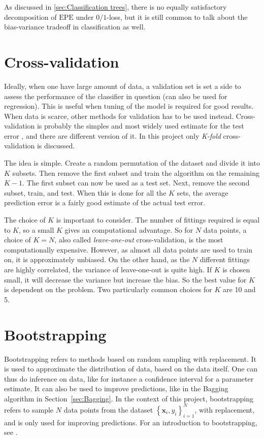 As discussed in \ref{sec:Classification trees}, there is no equally satisfactory decomposition of $\mathrm{EPE}$ under $0/1$-loss, but it is still common to talk about the bias-variance tradeoff in classification as well.



\section{Cross-validation}
\label{sec:Cross-validation}
Ideally, when one have large amount of data, a validation set is set a side to assess the performance of the classifier in question (can also be used for regression). This is useful when tuning of the model is required for good results. When data is scarce, other methods for validation has to be used instead. Cross-validation is probably the simples and most widely used estimate for the test error \citep{modstat}, and there are different version of it. In this project only \textit{K-fold} cross-validation is discussed. 

The idea is simple. Create a random permutation of the dataset and divide it into $K$ subsets. Then remove the first subset and train the algorithm on the remaining $K-1$. The first subset can now be used as a test set. Next, remove the second subset, train, and test. When this is done for all the $K$ sets, the average prediction error is a fairly good estimate of the actual test error. 

The choice of $K$ is important to consider. The number of fittings required is equal to $K$, so a small $K$ gives an computational advantage. So for $N$ data points, a choice of $K = N$, also called \textit{leave-one-out} cross-validation, is the most computationally expensive. However, as almost all data points are used to train on, it is approximately unbiased. On the other hand, as the $N$ different fittings are highly correlated, the variance of leave-one-out is quite high. If $K$ is chosen small, it will decrease the variance but increase the bias. So the best value for $K$ is dependent on the problem. Two particularly common choices for $K$ are 10 and 5.


\section{Bootstrapping}
\label{sec:Bootstrapping}
Bootstrapping refers to methods based on random sampling with replacement. It is used to approximate the distribution of data, based on the data itself. One can thus do inference on data, like for instance a confidence interval for a parameter estimate. It can also be used to improve predictions, like in the Bagging algorithm in Section~\ref{sec:Bagging}. In the context of this project, bootstrapping refers to sample $N$ data points from the dataset $\left\{ \mathbf{x}_i, y_i \right\}_{i = 1}^N$, with replacement, and is only used for improving predictions. 
For an introduction to bootstrapping, see \cite{efron1994bootstrap}.


